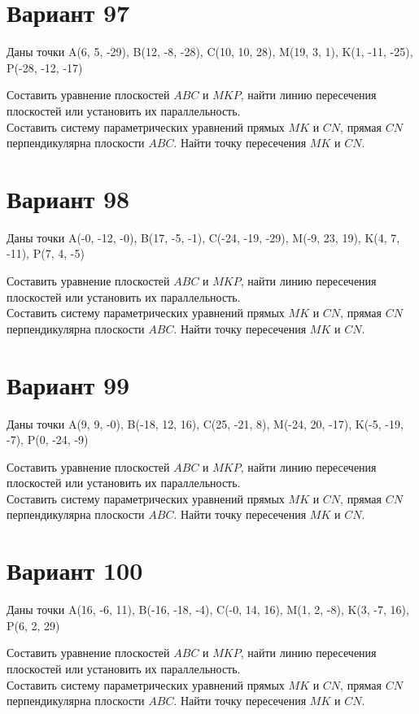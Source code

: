 \documentclass[11pt]{article}
\begin{document}
\section*{Вариант 97}
Даны точки A(6, 5, -29), B(12, -8, -28), C(10, 10, 28), M(19, 3, 1), K(1, -11, -25), P(-28, -12, -17)

Составить уравнение плоскостей $ABC$ и $MKP$, найти линию пересечения плоскостей или установить их параллельность.\\
Составить систему параметрических уравнений прямых $MK$ и $CN$, прямая $CN$ перпендикулярна плоскости $ABC$. Найти точку пересечения $MK$ и $CN$.

\section*{Вариант 98}
Даны точки A(-0, -12, -0), B(17, -5, -1), C(-24, -19, -29), M(-9, 23, 19), K(4, 7, -11), P(7, 4, -5)

Составить уравнение плоскостей $ABC$ и $MKP$, найти линию пересечения плоскостей или установить их параллельность.\\
Составить систему параметрических уравнений прямых $MK$ и $CN$, прямая $CN$ перпендикулярна плоскости $ABC$. Найти точку пересечения $MK$ и $CN$.

\section*{Вариант 99}
Даны точки A(9, 9, -0), B(-18, 12, 16), C(25, -21, 8), M(-24, 20, -17), K(-5, -19, -7), P(0, -24, -9)

Составить уравнение плоскостей $ABC$ и $MKP$, найти линию пересечения плоскостей или установить их параллельность.\\
Составить систему параметрических уравнений прямых $MK$ и $CN$, прямая $CN$ перпендикулярна плоскости $ABC$. Найти точку пересечения $MK$ и $CN$.

\section*{Вариант 100}
Даны точки A(16, -6, 11), B(-16, -18, -4), C(-0, 14, 16), M(1, 2, -8), K(3, -7, 16), P(6, 2, 29)

Составить уравнение плоскостей $ABC$ и $MKP$, найти линию пересечения плоскостей или установить их параллельность.\\
Составить систему параметрических уравнений прямых $MK$ и $CN$, прямая $CN$ перпендикулярна плоскости $ABC$. Найти точку пересечения $MK$ и $CN$.
\end{document}
